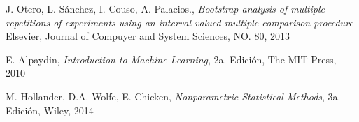 \begin{thebibliography}{99}
	J. Otero, L. Sánchez, I. Couso, A. Palacios.,
	\emph{Bootstrap analysis of multiple repetitions of experiments using an interval-valued multiple comparison procedure}
	Elsevier, Journal of Compuyer and System Sciences,
	NO. 80,
	2013

	E. Alpaydin,
	\emph{Introduction to Machine Learning},
	2a. Edición, 
	The MIT Press,
	2010

	M. Hollander, D.A. Wolfe, E. Chicken,
	\emph{Nonparametric Statistical Methods},
	3a. Edición,
	Wiley,
	2014
	
\end{thebibliography}